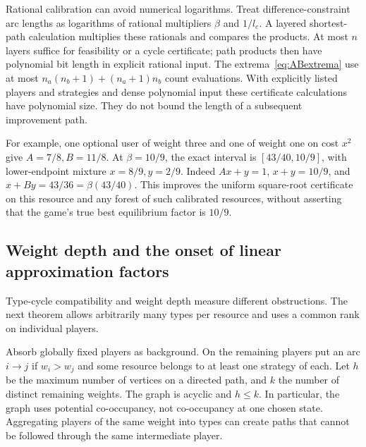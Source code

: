 \documentclass[manuscript,review,anonymous]{acmart}
\begin{document}
Rational calibration can avoid numerical logarithms. Treat difference-constraint arc lengths as logarithms of rational multipliers $\beta$ and $1/l_e$. A layered shortest-path calculation multiplies these rationals and compares the products. At most $n$ layers suffice for feasibility or a cycle certificate; path products then have polynomial bit length in explicit rational input. The extrema~\eqref{eq:ABextrema} use at most $n_a(n_b+1)+(n_a+1)n_b$ count evaluations. With explicitly listed players and strategies and dense polynomial input these certificate calculations have polynomial size. They do not bound the length of a subsequent improvement path.

For example, one optional user of weight three and one of weight one on cost $x^2$ give $A=7/8,B=11/8$. At $\beta=10/9$, the exact interval is $[43/40,10/9]$, with lower-endpoint mixture $x=8/9,y=2/9$. Indeed $Ax+y=1$, $x+y=10/9$, and $x+By=43/36=\beta(43/40)$. This improves the uniform square-root certificate on this resource and any forest of such calibrated resources, without asserting that the game's true best equilibrium factor is $10/9$.

\subsection{Weight depth and the onset of linear approximation factors}\label{sec:depth}
Type-cycle compatibility and weight depth measure different obstructions. The next theorem allows arbitrarily many types per resource and uses a common rank on individual players.

Absorb globally fixed players as background. On the remaining players put an arc $i\to j$ if $w_i>w_j$ and some resource belongs to at least one strategy of each. Let $h$ be the maximum number of vertices on a directed path, and $k$ the number of distinct remaining weights. The graph is acyclic and $h\le k$. In particular, the graph uses potential co-occupancy, not co-occupancy at one chosen state. Aggregating players of the same weight into types can create paths that cannot be followed through the same intermediate player.
\end{document}
